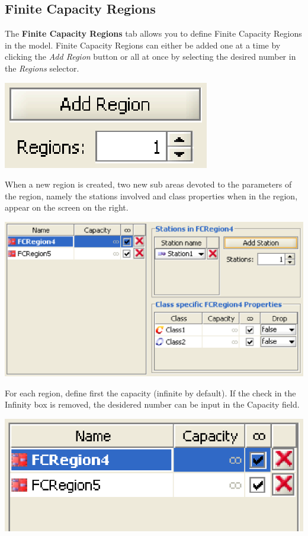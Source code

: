 \subsection{Finite Capacity Regions}
\label{sec:FiniteCapacityRegions}
The \textbf{Finite Capacity Regions} tab allows you to define Finite Capacity Regions in the model.
Finite Capacity Regions can either be added one at a time by clicking the \emph{Add Region} button or all at once by selecting the desired number in the \emph{Regions} selector.
\begin{center}
\includegraphics[scale=.5]{img/jsim/add_fcr.eps}
\end{center}
When a new region is created, two new sub areas devoted to the parameters of the region, namely the stations involved and class properties when in the region, appear on the screen on the right.
\begin{center}
\includegraphics[scale=.5]{img/jsim/fcr_bottom.eps}
\end{center}
For each region, define first the capacity (infinite by default). If the check in the Infinity box is removed, the desidered number can be input in the Capacity field.
\begin{center}
\includegraphics[scale=.5]{img/jsim/fcr_selection.eps}
\end{center}
